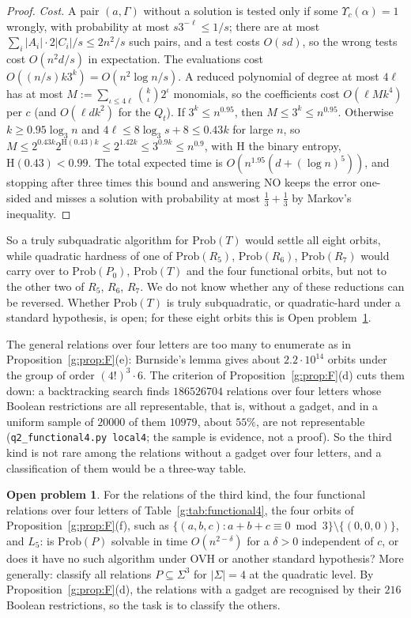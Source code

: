\documentclass[11pt]{article}
\theoremstyle{definition}
\newtheorem{problem}[theorem]{Open problem}
\theoremstyle{remark}
\newcommand{\Prob}{\mathrm{Prob}}
\begin{document}
\begin{proof}
\emph{Cost.} A pair $(a,\Gamma)$ without a solution is tested only if some $\Upsilon_c(\alpha)=1$ wrongly, with probability at most $s3^{-\ell}\le1/s$; there are at most $\sum_i|A_i|\cdot2|C_i|/s\le2n^2/s$ such pairs, and a test costs $O(sd)$, so the wrong tests cost $O(n^2d/s)$ in expectation. The evaluations cost $O((n/s)k3^k)=O(n^2\log n/s)$. A reduced polynomial of degree at most $4\ell$ has at most $M:=\sum_{\iota\le4\ell}\binom k\iota2^\iota$ monomials, so the coefficients cost $O(\ell Mk^4)$ per $c$ (and $O(\ell dk^2)$ for the $Q_t$). If $3^k\le n^{0.95}$, then $M\le3^k\le n^{0.95}$. Otherwise $k\ge0.95\log_3n$ and $4\ell\le8\log_3s+8\le0.43k$ for large $n$, so $M\le2^{0.43k}2^{\mathrm H(0.43)k}\le2^{1.42k}\le3^{0.9k}\le n^{0.9}$, with $\mathrm H$ the binary entropy, $\mathrm H(0.43)<0.99$. The total expected time is $O(n^{1.95}(d+(\log n)^5))$, and stopping after three times this bound and answering NO keeps the error one-sided and misses a solution with probability at most $\frac13+\frac13$ by Markov's inequality.
\end{proof}

So a truly subquadratic algorithm for $\Prob(T)$ would settle all eight orbits, while quadratic hardness of one of $\Prob(R_5)$, $\Prob(R_6)$, $\Prob(R_7)$ would carry over to $\Prob(P_0)$, $\Prob(T)$ and the four functional orbits, but not to the other two of $R_5$, $R_6$, $R_7$. We do not know whether any of these reductions can be reversed. Whether $\Prob(T)$ is truly subquadratic, or quadratic-hard under a standard hypothesis, is open; for these eight orbits this is Open problem~\ref{g:prob:L5}.

The general relations over four letters are too many to enumerate as in Proposition~\ref{g:prop:F}(e): Burnside's lemma gives about $2.2\cdot10^{14}$ orbits under the group of order $(4!)^3\cdot6$. The criterion of Proposition~\ref{g:prop:F}(d) cuts them down: a backtracking search finds $186526704$ relations over four letters whose Boolean restrictions are all representable, that is, without a gadget, and in a uniform sample of $20000$ of them $10979$, about $55\%$, are not representable (\texttt{q2\_functional4.py local4}; the sample is evidence, not a proof). So the third kind is not rare among the relations without a gadget over four letters, and a classification of them would be a three-way table.

\begin{problem}\label{g:prob:L5}
For the relations of the third kind, the four functional relations over four letters of Table~\ref{g:tab:functional4}, the four orbits of Proposition~\ref{g:prop:F}(f), such as $\{(a,b,c):a+b+c\equiv0\bmod3\}\setminus\{(0,0,0)\}$, and $L_5$: is $\Prob(P)$ solvable in time $O(n^{2-\delta})$ for a $\delta>0$ independent of $c$, or does it have no such algorithm under OVH or another standard hypothesis? More generally: classify all relations $P\subseteq\Sigma^3$ for $|\Sigma|=4$ at the quadratic level. By Proposition~\ref{g:prop:F}(d), the relations with a gadget are recognised by their $216$ Boolean restrictions, so the task is to classify the others.
\end{problem}
\end{document}
